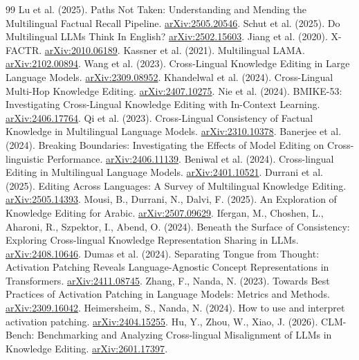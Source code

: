 \documentclass[11pt]{article}
\begin{document}
\begin{thebibliography}{99}
 Lu et al. (2025). Paths Not Taken: Understanding and Mending the Multilingual Factual Recall Pipeline. \href{https://arxiv.org/abs/2505.20546}{arXiv:2505.20546}.
 Schut et al. (2025). Do Multilingual LLMs Think In English? \href{https://arxiv.org/abs/2502.15603}{arXiv:2502.15603}.
 Jiang et al. (2020). X-FACTR. \href{https://arxiv.org/abs/2010.06189}{arXiv:2010.06189}.
 Kassner et al. (2021). Multilingual LAMA. \href{https://arxiv.org/abs/2102.00894}{arXiv:2102.00894}.
 Wang et al. (2023). Cross-Lingual Knowledge Editing in Large Language Models. \href{https://arxiv.org/abs/2309.08952}{arXiv:2309.08952}.
 Khandelwal et al. (2024). Cross-Lingual Multi-Hop Knowledge Editing. \href{https://arxiv.org/abs/2407.10275}{arXiv:2407.10275}.
 Nie et al. (2024). BMIKE-53: Investigating Cross-Lingual Knowledge Editing with In-Context Learning. \href{https://arxiv.org/abs/2406.17764}{arXiv:2406.17764}.
 Qi et al. (2023). Cross-Lingual Consistency of Factual Knowledge in Multilingual Language Models. \href{https://arxiv.org/abs/2310.10378}{arXiv:2310.10378}.
 Banerjee et al. (2024). Breaking Boundaries: Investigating the Effects of Model Editing on Cross-linguistic Performance. \href{https://arxiv.org/abs/2406.11139}{arXiv:2406.11139}.
 Beniwal et al. (2024). Cross-lingual Editing in Multilingual Language Models. \href{https://arxiv.org/abs/2401.10521}{arXiv:2401.10521}.
 Durrani et al. (2025). Editing Across Languages: A Survey of Multilingual Knowledge Editing. \href{https://arxiv.org/abs/2505.14393}{arXiv:2505.14393}.
 Mousi, B., Durrani, N., Dalvi, F. (2025). An Exploration of Knowledge Editing for Arabic. \href{https://arxiv.org/abs/2507.09629}{arXiv:2507.09629}.
 Ifergan, M., Choshen, L., Aharoni, R., Szpektor, I., Abend, O. (2024). Beneath the Surface of Consistency: Exploring Cross-lingual Knowledge Representation Sharing in LLMs. \href{https://arxiv.org/abs/2408.10646}{arXiv:2408.10646}.
 Dumas et al. (2024). Separating Tongue from Thought: Activation Patching Reveals Language-Agnostic Concept Representations in Transformers. \href{https://arxiv.org/abs/2411.08745}{arXiv:2411.08745}.
 Zhang, F., Nanda, N. (2023). Towards Best Practices of Activation Patching in Language Models: Metrics and Methods. \href{https://arxiv.org/abs/2309.16042}{arXiv:2309.16042}.
 Heimersheim, S., Nanda, N. (2024). How to use and interpret activation patching. \href{https://arxiv.org/abs/2404.15255}{arXiv:2404.15255}.
 Hu, Y., Zhou, W., Xiao, J. (2026). CLM-Bench: Benchmarking and Analyzing Cross-lingual Misalignment of LLMs in Knowledge Editing. \href{https://arxiv.org/abs/2601.17397}{arXiv:2601.17397}.
\end{thebibliography}
\end{document}
